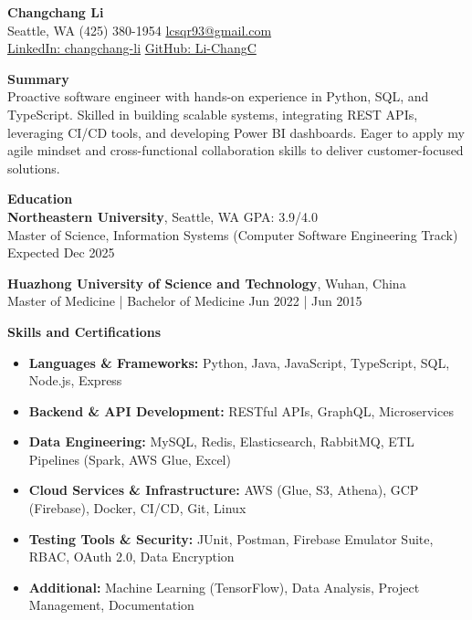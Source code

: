 \documentclass[a4paper,10pt]{article}
\begin{document}
\begin{center}
    {\LARGE \textbf{Changchang Li}} \\
    Seattle, WA \textbar{} (425) 380-1954 \textbar{} \href{mailto:lcsqr93@gmail.com}{lcsqr93@gmail.com} \\
    \href{https://www.linkedin.com/in/changchang-li}{LinkedIn: changchang-li} \textbar{}
    \href{https://github.com/Li-ChangC}{GitHub: Li-ChangC}
\end{center}

\vspace{0.2cm}
\noindent \textbf{\Large Summary} \\
Proactive software engineer with hands-on experience in Python, SQL, and TypeScript. Skilled in building scalable systems, integrating REST APIs, leveraging CI/CD tools, and developing Power BI dashboards. Eager to apply my agile mindset and cross-functional collaboration skills to deliver customer-focused solutions.

\vspace{0.2cm}
\noindent \textbf{\Large Education} \\
\textbf{Northeastern University}, Seattle, WA \hfill GPA: 3.9/4.0 \\
Master of Science, Information Systems (Computer Software Engineering Track) \hfill Expected Dec 2025

\textbf{Huazhong University of Science and Technology}, Wuhan, China \\
Master of Medicine | Bachelor of Medicine \hfill Jun 2022 | Jun 2015

\vspace{0.2cm}
\noindent \textbf{\Large Skills and Certifications}
\begin{itemize}[leftmargin=*]
    \item \textbf{Languages \& Frameworks:} Python, Java, JavaScript, TypeScript, SQL, Node.js, Express
    \item \textbf{Backend \& API Development:} RESTful APIs, GraphQL, Microservices
    \item \textbf{Data Engineering:} MySQL, Redis, Elasticsearch, RabbitMQ, ETL Pipelines (Spark, AWS Glue, Excel)
    \item \textbf{Cloud Services \& Infrastructure:} AWS (Glue, S3, Athena), GCP (Firebase), Docker, CI/CD, Git, Linux
    \item \textbf{Testing Tools \& Security:} JUnit, Postman, Firebase Emulator Suite, RBAC, OAuth 2.0, Data Encryption
    \item \textbf{Additional:} Machine Learning (TensorFlow), Data Analysis, Project Management, Documentation
\end{itemize}
\end{document}
